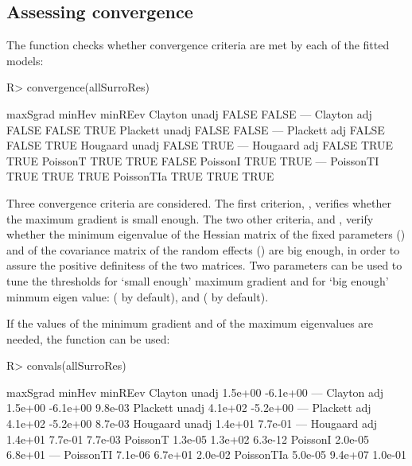 \documentclass[article,shortnames, nojss]{jss}\usepackage[]{graphicx}\usepackage[]{color}
\begin{document}
\subsection{Assessing convergence}
The function  checks whether convergence criteria
  are met by each of the fitted models:
\begin{Schunk}
\begin{Sinput}
R>   convergence(allSurroRes)
\end{Sinput}
\begin{Soutput}
               maxSgrad minHev minREev
Clayton unadj     FALSE  FALSE     ---
Clayton adj       FALSE  FALSE    TRUE
Plackett unadj    FALSE  FALSE     ---
Plackett adj      FALSE  FALSE    TRUE
Hougaard unadj    FALSE   TRUE     ---
Hougaard adj      FALSE   TRUE    TRUE
PoissonT           TRUE   TRUE   FALSE
PoissonI           TRUE   TRUE     ---
PoissonTI          TRUE   TRUE    TRUE
PoissonTIa         TRUE   TRUE    TRUE
\end{Soutput}
\end{Schunk}
Three convergence criteria are considered.
The first criterion, ,
  verifies whether the maximum gradient is small enough.
The two other criteria,  and ,
  verify whether the minimum eigenvalue
  of the Hessian matrix of the fixed parameters ()
  and of the covariance matrix of the random effects ()
  are big enough,
  in order to assure the positive definitess of the two matrices.
Two parameters can be used to tune the thresholds
  for `small enough' maximum gradient and 
  for `big enough' minmum eigen value:
   ( by default),
  and  ( by default).

If the values of the minimum gradient and of the maximum eigenvalues are needed,
  the function  can be used:
\begin{Schunk}
\begin{Sinput}
R>   convals(allSurroRes)
\end{Sinput}
\begin{Soutput}
               maxSgrad   minHev minREev
Clayton unadj   1.5e+00 -6.1e+00     ---
Clayton adj     1.5e+00 -6.1e+00 9.8e-03
Plackett unadj  4.1e+02 -5.2e+00     ---
Plackett adj    4.1e+02 -5.2e+00 8.7e-03
Hougaard unadj  1.4e+01  7.7e-01     ---
Hougaard adj    1.4e+01  7.7e-01 7.7e-03
PoissonT        1.3e-05  1.3e+02 6.3e-12
PoissonI        2.0e-05  6.8e+01     ---
PoissonTI       7.1e-06  6.7e+01 2.0e-02
PoissonTIa      5.0e-05  9.4e+07 1.0e-01
\end{Soutput}
\end{Schunk}
\end{document}
